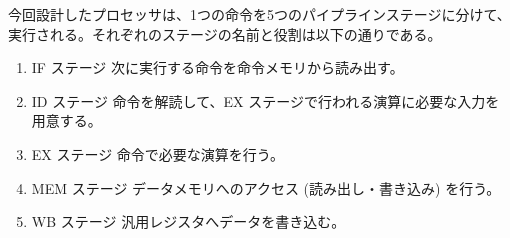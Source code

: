 \documentclass[../specifications.tex]{subfiles}
\begin{document}
  今回設計したプロセッサは、1つの命令を5つのパイプラインステージに分けて、
  実行される。それぞれのステージの名前と役割は以下の通りである。
  \begin{enumerate}
    \item IF ステージ
    \newline 次に実行する命令を命令メモリから読み出す。

    \item ID ステージ
    \newline 命令を解読して、EX ステージで行われる演算に必要な入力を用意する。

    \item EX ステージ
    \newline 命令で必要な演算を行う。

    \item MEM ステージ
    \newline データメモリへのアクセス (読み出し・書き込み) を行う。

    \item WB ステージ
    \newline 汎用レジスタへデータを書き込む。

  \end{enumerate}
\end{document}
